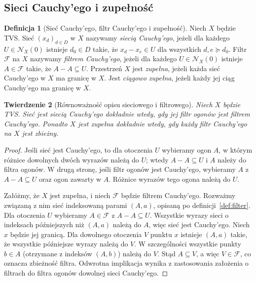 \documentclass[11pt,a4paper]{article}
\numberwithin{equation}{section}
\theoremstyle{plain}
\newtheorem{twierdzenie}{Twierdzenie}[section]
\theoremstyle{definition}
\newtheorem{definicja}[twierdzenie]{Definicja}
\theoremstyle{remark}
\begin{document}
\subsection{Sieci Cauchy'ego i zupełność}

\begin{definicja}[Sieć Cauchy'ego, filtr Cauchy'ego i zupełność]
\label{def:tvs-complete}
Niech $X$ będzie TVS. Sieć $(x_d)_{d\in D}$ w $X$ nazywamy
\emph{siecią Cauchy'ego}, jeżeli dla każdego $U\in\mathcal N_X(0)$
istnieje $d_0\in D$ takie, że
$ x_d-x_e\in U $ dla wszystkich $d,e\succeq d_0$.
Filtr $\mathcal F$ na $X$ nazywamy \emph{filtrem Cauchy'ego},
jeżeli dla każdego $U\in\mathcal N_X(0)$ istnieje
$A\in\mathcal F$ takie, że $A-A\subseteq U$.
Przestrzeń $X$ jest \emph{zupełna}, jeżeli każda sieć Cauchy'ego
w $X$ ma granicę w $X$. Jest \emph{ciągowo zupełna},
jeżeli każdy jej ciąg Cauchy'ego ma granicę w $X$.
\end{definicja}

\begin{twierdzenie}[Równoważność opisu sieciowego i filtrowego]
\label{thm:filter-cauchy}
Niech $X$ będzie TVS. Sieć jest siecią Cauchy'ego dokładnie wtedy,
gdy jej filtr ogonów jest filtrem Cauchy'ego. Ponadto $X$ jest
zupełna dokładnie wtedy, gdy każdy filtr Cauchy'ego na $X$
jest zbieżny.
\end{twierdzenie}
\begin{proof}
Jeśli sieć jest Cauchy'ego, to dla otoczenia $U$ wybieramy
ogon $A$, w którym różnice dowolnych dwóch wyrazów należą do $U$;
wtedy $A-A\subseteq U$ i $A$ należy do filtra ogonów.
W drugą stronę, jeśli filtr ogonów jest Cauchy'ego, wybieramy
$A$ z $A-A\subseteq U$ oraz ogon zawarty w $A$. Różnice
wyrazów tego ogona należą do $U$.

Załóżmy, że $X$ jest zupełna, i niech $\mathcal F$ będzie filtrem
Cauchy'ego. Rozważmy związaną z nim sieć indeksowaną parami
$(A,a)$, opisaną po definicji~\ref{def:filter}. Dla otoczenia
$U$ wybieramy $A\in\mathcal F$ z $A-A\subseteq U$.
Wszystkie wyrazy sieci o indeksach późniejszych niż $(A,a)$
należą do $A$, więc sieć jest Cauchy'ego. Niech $x$ będzie jej
granicą. Dla dowolnego otoczenia $V$ punktu $x$ istnieje
$(A,a)$ takie, że wszystkie późniejsze wyrazy należą do $V$.
W szczególności wszystkie punkty $b\in A$ (otrzymane
z indeksów $(A,b)$) należą do $V$. Stąd $A\subseteq V$,
a więc $V\in\mathcal F$, co oznacza zbieżność filtra.
Odwrotna implikacja wynika z zastosowania założenia o filtrach
do filtra ogonów dowolnej sieci Cauchy'ego.
\end{proof}
\end{document}

